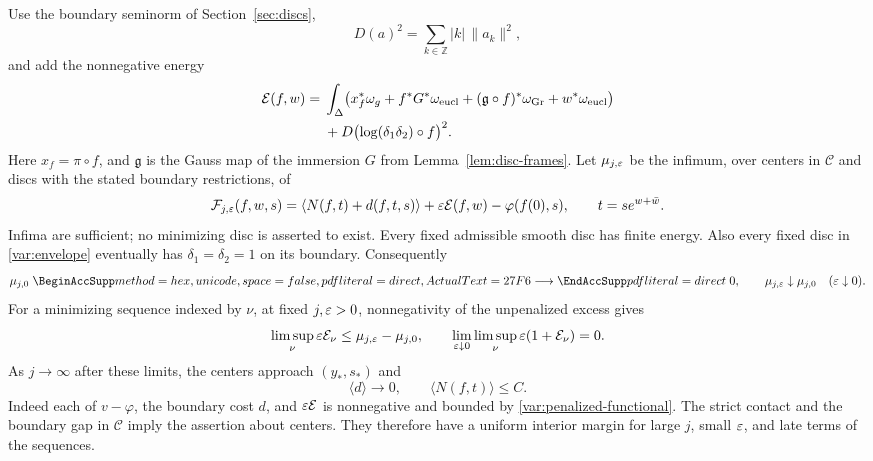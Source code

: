 Use the boundary seminorm of Section~\ref{sec:discs},
\[
 D(a)^2=\sum_{k\in\mathbb Z}|k|\,\|a_k\|^2,
\]
and add the nonnegative energy
\begin{equation}
 \begin{split}
 \mathcal E(f,w)={}&\int_\Delta\bigl(x_f^*\omega_g+
 f^*G^*\omega_{\rm eucl}+
 (\mathfrak g\circ f)^*\omega_{\operatorname{Gr}}
 +w^*\omega_{\rm eucl}\bigr)\\
 &+D\bigl(\log(\delta_1\delta_2)\circ f\bigr)^2.
 \end{split}
 \label{var:energy}
\end{equation}
Here $x_f=\pi\circ f$, and $\mathfrak g$ is the Gauss map of the immersion $G$ from
Lemma~\ref{lem:disc-frames}.
Let $\mu_{j,\varepsilon}$ be the infimum, over centers in $\mathcal C$ and discs
with the stated boundary restrictions, of
\begin{equation}
 \mathcal F_{j,\varepsilon}(f,w,s)=
 \langle N(f,t)+d(f,t,s)\rangle+\varepsilon\mathcal E(f,w)
 -\varphi(f(0),s),\qquad t=s e^{w+\bar w}.
 \label{var:penalized-functional}
\end{equation}
Infima are sufficient; no minimizing disc is asserted to exist.
Every fixed admissible smooth disc has finite energy.  Also every fixed
disc in \eqref{var:envelope} eventually has $\delta_1=\delta_2=1$ on its
boundary.  Consequently
\begin{equation}
 \mu_{j,0}\longrightarrow0,\qquad
 \mu_{j,\eps}\downarrow\mu_{j,0}\quad(\eps\downarrow0).
 \label{var:infimum-limits}
\end{equation}
For a minimizing sequence indexed by $\nu$, at fixed $j,\varepsilon>0$,
nonnegativity of the unpenalized excess gives
\begin{equation}
 \limsup_{\nu}\varepsilon\mathcal E_\nu
 \le\mu_{j,\varepsilon}-\mu_{j,0},\qquad
 \lim_{\varepsilon\downarrow0}\limsup_\nu\varepsilon(1+\mathcal E_\nu)=0.
 \label{var:vanishing-penalty}
\end{equation}
As $j\to\infty$ after these limits, the centers approach $(y_*,s_*)$ and
\begin{equation}
 \langle d\rangle\longrightarrow0,\qquad
 \langle N(f,t)\rangle\le C.
 \label{var:small-walls}
\end{equation}
Indeed each of $v-\varphi$, the boundary cost $d$, and $\varepsilon\mathcal E$
is nonnegative and bounded by \eqref{var:penalized-functional}.
The strict contact and the boundary gap in $\mathcal C$ imply the
assertion about centers.  They therefore have a uniform interior margin
for large $j$, small $\varepsilon$, and late terms of the sequences.

